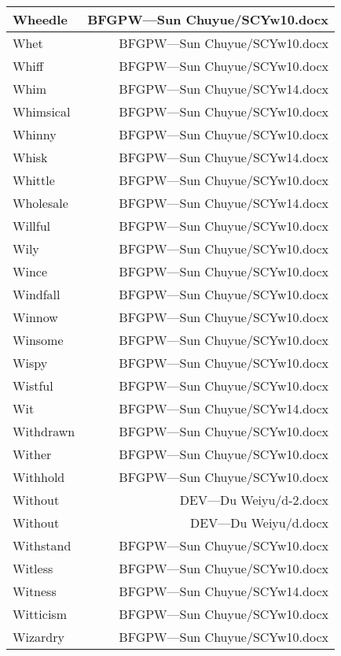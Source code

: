 \documentclass{article}
\begin{document}
\begin{center}
\begin{longtable}{|l|r|}
Wheedle  &  BFGPW---Sun Chuyue/SCYw10.docx\\  
\hline
Whet  &  BFGPW---Sun Chuyue/SCYw10.docx\\  
\hline
Whiff  &  BFGPW---Sun Chuyue/SCYw10.docx\\  
\hline
Whim  &  BFGPW---Sun Chuyue/SCYw14.docx\\  
\hline
Whimsical  &  BFGPW---Sun Chuyue/SCYw10.docx\\  
\hline
Whinny  &  BFGPW---Sun Chuyue/SCYw10.docx\\  
\hline
Whisk  &  BFGPW---Sun Chuyue/SCYw14.docx\\  
\hline
Whittle  &  BFGPW---Sun Chuyue/SCYw10.docx\\  
\hline
Wholesale  &  BFGPW---Sun Chuyue/SCYw14.docx\\  
\hline
Willful  &  BFGPW---Sun Chuyue/SCYw10.docx\\  
\hline
Wily  &  BFGPW---Sun Chuyue/SCYw10.docx\\  
\hline
Wince  &  BFGPW---Sun Chuyue/SCYw10.docx\\  
\hline
Windfall  &  BFGPW---Sun Chuyue/SCYw10.docx\\  
\hline
Winnow  &  BFGPW---Sun Chuyue/SCYw10.docx\\  
\hline
Winsome  &  BFGPW---Sun Chuyue/SCYw10.docx\\  
\hline
Wispy  &  BFGPW---Sun Chuyue/SCYw10.docx\\  
\hline
Wistful  &  BFGPW---Sun Chuyue/SCYw10.docx\\  
\hline
Wit  &  BFGPW---Sun Chuyue/SCYw14.docx\\  
\hline
Withdrawn  &  BFGPW---Sun Chuyue/SCYw10.docx\\  
\hline
Wither  &  BFGPW---Sun Chuyue/SCYw10.docx\\  
\hline
Withhold  &  BFGPW---Sun Chuyue/SCYw10.docx\\  
\hline
Without  &  DEV---Du Weiyu/d-2.docx\\  
\hline
Without  &  DEV---Du Weiyu/d.docx\\  
\hline
Withstand  &  BFGPW---Sun Chuyue/SCYw10.docx\\  
\hline
Witless  &  BFGPW---Sun Chuyue/SCYw10.docx\\  
\hline
Witness  &  BFGPW---Sun Chuyue/SCYw14.docx\\  
\hline
Witticism  &  BFGPW---Sun Chuyue/SCYw10.docx\\  
\hline
Wizardry  &  BFGPW---Sun Chuyue/SCYw10.docx\\  
\hline

\end{longtable}
\end{center}
\end{document}
